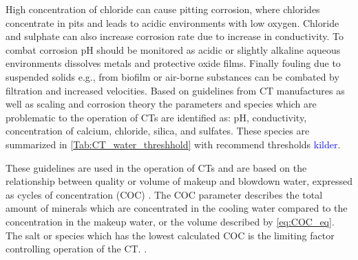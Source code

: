 
High concentration of chloride can cause pitting corrosion, where chlorides concentrate in pits and leads to acidic environments with low oxygen. \citep{Ma12} %
Chloride and sulphate can also increase corrosion rate due to  increase in conductivity.
To combat corrosion pH should be monitored as acidic or slightly alkaline aqueous environments dissolves metals and protective oxide films. \citep{PracticalApproachWater2007}
Finally fouling due to suspended solids e.g., from biofilm or air-borne substances can be combated by filtration and increased velocities. \citep{PracticalApproachWater2007}
Based on guidelines from CT manufactures as well as scaling and corrosion theory the parameters and species which are problematic to the operation of CTs are identified as: pH, conductivity, concentration of calcium, chloride, silica, and sulfates. 
These species are summarized in 
\cref{Tab:CT_water_threshhold} with recommend thresholds \textcolor{blue}{kilder}. 
 



These guidelines are used in the operation of CTs and are based on the relationship between quality or volume of makeup and blowdown water, expressed as cycles of concentration (COC) \citep{IntroductionCoolingTower2014}. 
The COC parameter describes the total amount of minerals which are concentrated in the cooling water compared to the concentration in the makeup water, or the volume described by \cref{eq:COC_eq}. \citep{IntroductionCoolingTower2014} 
The salt or species which has the lowest calculated COC is the limiting factor controlling operation of the CT. \citep{IntroductionCoolingTower2014} \citep{PracticalApproachWater2007}. 


